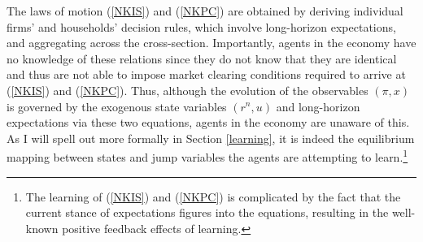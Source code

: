 \documentclass[11pt]{article}
\renewcommand{\[}{\begin{equation}}
\renewcommand{\]}{\end{equation}}
\begin{document}
The laws of motion (\ref{NKIS}) and (\ref{NKPC}) are obtained by deriving individual firms' and households' decision rules, which involve long-horizon expectations, and aggregating across the cross-section. Importantly, agents in the economy have no knowledge of these relations since they do not know that they are identical and thus are not able to impose market clearing conditions required to arrive at (\ref{NKIS}) and (\ref{NKPC}). Thus, although the evolution of the observables $(\pi,x)$ is governed by the exogenous state variables $(r^n, u)$ and long-horizon expectations via these two equations, agents in the economy are unaware of this. As I will spell out more formally in Section \ref{learning}, it is indeed the equilibrium mapping between states and jump variables the agents are attempting to learn.\footnote{The learning of (\ref{NKIS}) and (\ref{NKPC}) is complicated by the fact that the current stance of expectations figures into the equations, resulting in the well-known positive feedback effects of learning.} 
\end{document}
